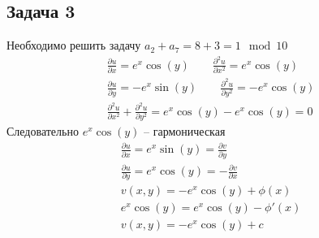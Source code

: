 \subsection*{Задача 3}
	Необходимо решить задачу $a_2 + a_7 = 8 + 3 = 1 \mod 10$
	\begin{gather*}
		\frac{\partial u}{\partial x} = e^x \cos(y)\qquad
		\frac{\partial^2 u}{\partial x^2} = e^x \cos(y)\\
		\frac{\partial u}{\partial y} = -e^x \sin(y)\qquad
		\frac{\partial^2 u}{\partial y^2} = -e^x \cos(y)\\
		\frac{\partial^2 u}{\partial x^2} + \frac{\partial^2 u}{\partial y^2} = e^x \cos(y) - e^x \cos(y) = 0
	\end{gather*}
	Следовательно $e^x \cos(y)$ -- гармоническая
	\begin{gather*}
		\frac{\partial u}{\partial x} = e^x \sin(y) = \frac{\partial v}{\partial y}\\
		\frac{\partial u}{\partial y} = e^x \cos(y) = -\frac{\partial v}{\partial x}\\
		v(x,y) = -e^x \cos(y) + \phi(x)\\
		e^x \cos(y) = e^x \cos(y) - \phi'(x)\\
		v(x,y) = -e^x \cos(y) + c
	\end{gather*}
\vskip 0.4in


